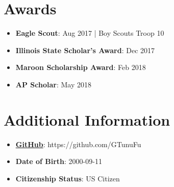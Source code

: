 \documentclass[letterpaper,11pt]{article}
\newcommand{\resumeItem}[2]{
  \item\small{
    \textbf{#1}{: #2 \vspace{-2pt}}
  }
}
\newcommand{\resumeSubItem}[2]{\resumeItem{#1}{#2}\vspace{-4pt}}
\newcommand{\resumeSubHeadingListStart}{\begin{itemize}[leftmargin=*]}
\newcommand{\resumeSubHeadingListEnd}{\end{itemize}}
\begin{document}
\section{Awards}
 \resumeSubHeadingListStart
 \resumeSubItem{Eagle Scout}
 {Aug 2017 | Boy Scouts Troop 10 }
 \resumeSubItem{Illinois State Scholar's Award}
 {Dec 2017}
 \resumeSubItem{Maroon Scholarship Award}
 {Feb 2018}
  \resumeSubItem{AP Scholar}
 {May 2018}
 \resumeSubHeadingListEnd
 
\section{Additional Information}
 \resumeSubHeadingListStart
 \resumeSubItem{\href{https://github.com/GTunuFu}{GitHub}}
 {https://github.com/GTunuFu}
 \resumeSubItem{Date of Birth}
 {2000-09-11}
  \resumeSubItem{Citizenship Status}
 {US Citizen}
 \resumeSubHeadingListEnd


\end{document}
